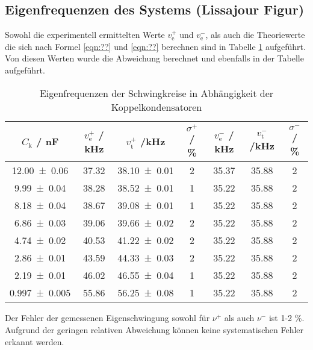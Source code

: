 \subsection{Eigenfrequenzen des Systems (Lissajour Figur)}
Sowohl die experimentell ermittelten Werte $v_\text{e}^+$ und  $v_\text{e}^-$, als auch die Theoriewerte die sich nach Formel \ref{eqn:??} und \ref{eqn:??} berechnen sind in Tabelle \ref{tab:eigen} aufgeführt. Von diesen Werten wurde die Abweichung berechnet und ebenfalls in der Tabelle aufgeführt.
\begin{table}
  \centering
  \begin{tabular}{c c c c c c c}
    \toprule
    $C_\text{k}$ / nF & $v_\text{e}^+$ / kHz & $v_\text{t}^+$ /kHz & $\sigma^+$ / \% & $v_\text{e}^-$ / kHz & $v_\text{t}^-$ /kHz & $\sigma^-$ / \%  \\
    \midrule
    \num{12.00 +- 0.06}	& 37.32	& \num{38.10 +- 0.01} & 2 & 35.37 & 35.88 & 2 \\
    \num{9.99 +- 0.04}	& 38.28	& \num{38.52 +- 0.01} & 1 & 35.22 & 35.88 & 2 \\
    \num{8.18 +- 0.04}	& 38.67 & \num{39.08 +- 0.01} & 1 & 35.22 & 35.88 & 2 \\
    \num{6.86 +- 0.03}	& 39.06 & \num{39.66 +- 0.02} & 2 & 35.22 & 35.88 & 2 \\
    \num{4.74 +- 0.02}	& 40.53 & \num{41.22 +- 0.02} & 2 & 35.22 & 35.88 & 2 \\
    \num{2.86 +- 0.01}	& 43.59 & \num{44.33 +- 0.03} & 2 & 35.22 & 35.88 & 2 \\
    \num{2.19 +- 0.01}	& 46.02 & \num{46.55 +- 0.04} & 1 & 35.22 & 35.88 & 2 \\
    \num{0.997 +- 0.005}	& 55.86 & \num{56.25 +- 0.08} & 1 & 35.22 & 35.88 & 2 \\
    \bottomrule
  \end{tabular}
  \caption{Eigenfrequenzen der Schwingkreise in Abhängigkeit der Koppelkondensatoren}
  \label{tab:eigen}
\end{table}
Der Fehler der gemessenen Eigenschwingung sowohl für $\nu^+$ als auch $\nu^-$ ist 1-2 \%. Aufgrund der geringen relativen Abweichung können keine systematischen Fehler erkannt werden. 
